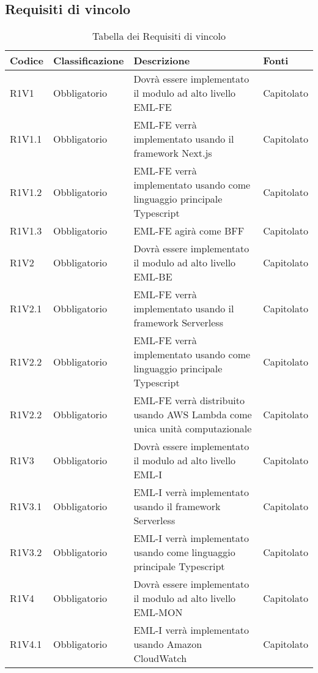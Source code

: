 \subsection{Requisiti di vincolo}

{


\centering
\renewcommand{\arraystretch}{2}
\begin{longtable}{C{2.5cm} C{2.8cm} C{6.7cm} C{2.5cm}}
\caption{Tabella dei Requisiti di vincolo}\\
\textbf{Codice} &
\textbf{Classificazione}&
\textbf{Descrizione}&
\textbf{Fonti}\\
\endhead


R1V1 & Obbligatorio & Dovrà essere implementato il modulo ad alto livello EML-FE & Capitolato \\
R1V1.1 & Obbligatorio & EML-FE verrà implementato usando il framework Next.js & Capitolato \\
R1V1.2 & Obbligatorio & EML-FE verrà implementato usando come linguaggio principale Typescript & Capitolato \\
R1V1.3 & Obbligatorio & EML-FE agirà come BFF & Capitolato \\


R1V2 & Obbligatorio & Dovrà essere implementato il modulo ad alto livello EML-BE & Capitolato \\
R1V2.1 & Obbligatorio & EML-FE verrà implementato usando il framework Serverless & Capitolato \\
R1V2.2 & Obbligatorio & EML-FE verrà implementato usando come linguaggio principale Typescript & Capitolato \\
R1V2.2 & Obbligatorio & EML-FE verrà distribuito usando AWS Lambda come unica unità computazionale & Capitolato \\


R1V3 & Obbligatorio & Dovrà essere implementato il modulo ad alto livello EML-I & Capitolato \\
R1V3.1 & Obbligatorio & EML-I verrà implementato usando il framework Serverless & Capitolato \\
R1V3.2 & Obbligatorio & EML-I verrà implementato usando come linguaggio principale Typescript & Capitolato \\

R1V4 & Obbligatorio & Dovrà essere implementato il modulo ad alto livello EML-MON & Capitolato \\
R1V4.1 & Obbligatorio & EML-I verrà implementato usando Amazon CloudWatch & Capitolato \\


\end{longtable}}
